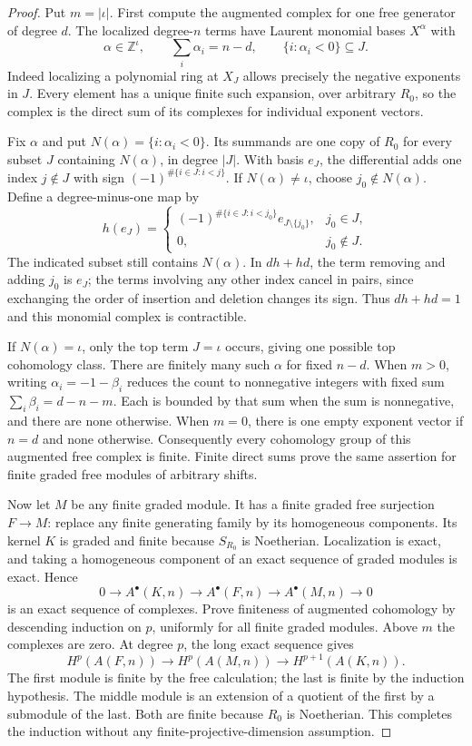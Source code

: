 \begin{proof}
Put $m=|\iota|$.  First compute the augmented complex for one
free generator of degree $d$.  The localized degree-$n$ terms
have Laurent monomial bases $X^\alpha$ with
\[
 \alpha\in\mathbb Z^{\iota},\qquad
 \sum_i\alpha_i=n-d,
 \qquad\{i:\alpha_i<0\}\subseteq J.
\]
Indeed localizing a polynomial ring at $X_J$ allows precisely
the negative exponents in $J$.  Every element has a unique finite
such expansion, over arbitrary $R_0$, so the complex is the
direct sum of its complexes for individual exponent vectors.

Fix $\alpha$ and put $N(\alpha)=\{i:\alpha_i<0\}$.
Its summands are one copy of $R_0$ for every subset $J$ containing
$N(\alpha)$, in degree $|J|$.  With basis $e_J$, the differential
adds one index $j\notin J$ with sign
$(-1)^{\#\{i\in J:i<j\}}$.
If $N(\alpha)\ne\iota$, choose $j_0\notin N(\alpha)$.
Define a degree-minus-one map by
\[
 h(e_J)=
 \begin{cases}
 (-1)^{\#\{i\in J:i<j_0\}}e_{J\setminus\{j_0\}},&j_0\in J,\\
 0,&j_0\notin J.
 \end{cases}
\]
The indicated subset still contains $N(\alpha)$.
In $dh+hd$, the term removing and adding $j_0$ is $e_J$;
the terms involving any other index cancel in pairs, since
exchanging the order of insertion and deletion changes its sign.
Thus $dh+hd=1$ and this monomial complex is contractible.

If $N(\alpha)=\iota$, only the top term $J=\iota$ occurs,
giving one possible top cohomology class.  There are finitely many
such $\alpha$ for fixed $n-d$.  When $m>0$, writing
$\alpha_i=-1-\beta_i$ reduces the count to nonnegative integers
with fixed sum $\sum_i\beta_i=d-n-m$.  Each is bounded by that
sum when the sum is nonnegative, and there are none otherwise.
When $m=0$, there is one empty exponent vector if $n=d$ and
none otherwise.  Consequently every cohomology group of this
augmented free complex is finite.  Finite direct sums prove the
same assertion for finite graded free modules of arbitrary shifts.

Now let $M$ be any finite graded module.  It has a finite graded
free surjection $F\to M$: replace any finite generating family
by its homogeneous components.  Its kernel $K$ is graded and
finite because $S_{R_0}$ is Noetherian.  Localization is exact,
and taking a homogeneous component of an exact sequence of
graded modules is exact.  Hence
\[
 0\longrightarrow A^\bullet(K,n)
 \longrightarrow A^\bullet(F,n)
 \longrightarrow A^\bullet(M,n)\longrightarrow0
\]
is an exact sequence of complexes.  Prove finiteness of augmented
cohomology by descending induction on $p$, uniformly for all
finite graded modules.  Above $m$ the complexes are zero.  At
degree $p$, the long exact sequence gives
\[
 H^p(A(F,n))\longrightarrow H^p(A(M,n))
 \longrightarrow H^{p+1}(A(K,n)).
\]
The first module is finite by the free calculation; the last is
finite by the induction hypothesis.  The middle module is an
extension of a quotient of the first by a submodule of the last.
Both are finite because $R_0$ is Noetherian.  This completes
the induction without any finite-projective-dimension assumption.


\end{proof}
